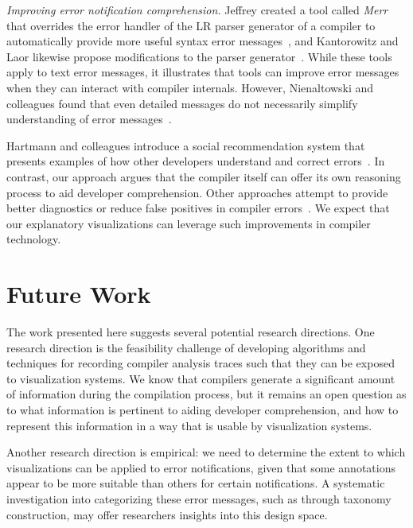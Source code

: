 \documentclass[conference]{IEEEtran}
\begin{document}
\textit{Improving error notification comprehension.} Jeffrey created a tool called \textit{Merr} that overrides the error handler of the LR parser generator of a compiler to automatically provide more useful syntax error messages~\cite{Jeffery2003}, and Kantorowitz and Laor likewise propose modifications to the parser generator~\cite{Kantorowitz1986}. While these tools apply to text error messages, it illustrates that tools can improve error messages when they can interact with compiler internals. However, Nienaltowski and colleagues found that even detailed messages do not necessarily simplify understanding of error messages~\cite{Nienaltowski2008}. 

Hartmann and colleagues introduce a social recommendation system that presents examples of how other developers understand and correct errors~\cite{Hartmann2010}. In contrast, our approach argues that the compiler itself can offer its own reasoning process to aid developer comprehension. Other approaches attempt to provide better diagnostics or reduce false positives in compiler errors~\cite{Boustani2011,Campbell2014}. We expect that our explanatory visualizations can leverage such improvements in compiler technology. 




\section{Future Work}

The work presented here suggests several potential research directions. One research direction is the feasibility challenge of developing algorithms and techniques for recording compiler analysis traces such that they can be exposed to visualization systems. We know that compilers generate a significant amount of information during the compilation process, but it remains an open question as to what information is pertinent to aiding developer comprehension, and how to represent this information in a way that is usable by visualization systems.

Another research direction is empirical: we need to determine the extent to which visualizations can be applied to error notifications, given that some annotations appear to be more suitable than others for certain notifications. A systematic investigation into categorizing these error messages, such as through taxonomy construction, may offer researchers insights into this design space. 
\end{document}

